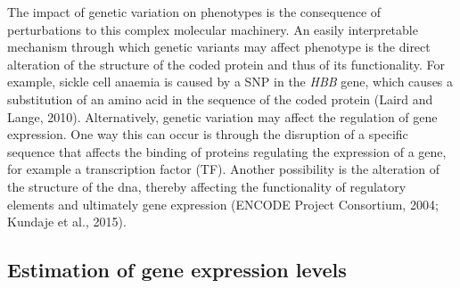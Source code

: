 The impact of genetic variation on phenotypes is the consequence of perturbations to this complex molecular machinery.
An easily interpretable mechanism through which genetic variants may affect phenotype is the direct alteration of the structure of the coded protein and thus of its functionality. 
For example, sickle cell anaemia is caused by a SNP in the \textit{HBB} gene, which causes a substitution of an amino acid in the sequence of the coded protein (Laird and Lange, 2010). 
Alternatively, genetic variation may affect the regulation of gene expression. 
One way this can occur is through the disruption of a specific sequence that affects the binding of proteins regulating the expression of a gene, for example a transcription factor (TF). 
Another possibility is the alteration of the structure of the \gls{dna}, thereby affecting the functionality of regulatory elements and ultimately gene expression (ENCODE Project Consortium, 2004; Kundaje et al., 2015). 

\subsection{Estimation of gene expression levels}

